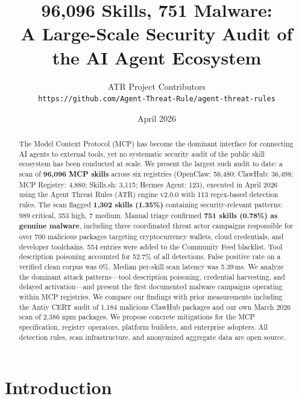 \documentclass[letterpaper,twocolumn,10pt]{article}
\title{\Large \textbf{96,096 Skills, 751 Malware:\\A Large-Scale Security Audit of the AI Agent Ecosystem}}
\author{
  ATR Project Contributors\\
  \texttt{https://github.com/Agent-Threat-Rule/agent-threat-rules}
}
\date{April 2026}
\begin{document}
\maketitle

\begin{abstract}

The Model Context Protocol (MCP) has become the dominant interface for
connecting AI agents to external tools, yet no systematic security audit
of the public skill ecosystem has been conducted at scale.  We present
the largest such audit to date: a scan of \textbf{96,096 MCP skills}
across six registries (OpenClaw: 56,480; ClawHub: 36,498; MCP Registry:
4,880; Skills.sh: 3,115; Hermes Agent: 123), executed in April 2026
using the Agent Threat Rules (ATR) engine v2.0.0 with 113 regex-based
detection rules.  The scan flagged \textbf{1,302 skills (1.35\%)}
containing security-relevant patterns: 989 critical, 353 high, 7 medium.
Manual triage confirmed \textbf{751 skills (0.78\%) as genuine malware},
including three coordinated threat actor campaigns responsible for over
700 malicious packages targeting cryptocurrency wallets, cloud
credentials, and developer toolchains.  554 entries were added to the
Community Feed blacklist.  Tool description poisoning accounted for 52.7\%
of all detections.  False positive rate on a verified clean corpus was
0\%.  Median per-skill scan latency was 5.39\,ms.  We analyze the
dominant attack patterns---tool description poisoning, credential
harvesting, and delayed activation---and present the first documented
malware campaigns operating within MCP registries.  We compare our
findings with prior measurements including the Antiy CERT audit of 1,184
malicious ClawHub packages and our own March 2026 scan of 2,386 npm
packages.  We propose concrete mitigations for the MCP specification,
registry operators, platform builders, and enterprise adopters.  All
detection rules, scan infrastructure, and anonymized aggregate data are
open source.

\end{abstract}

\section{Introduction}
\label{sec:intro}
\end{document}
